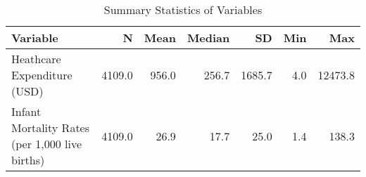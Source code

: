 \begin{table}[H]
\caption{Summary Statistics of Variables}
\label{Table 2:summary_stats}
\begin{tabular}{lrrrrrr}
\toprule
Variable & N & Mean & Median & SD & Min & Max \\
\midrule
Heathcare Expenditure (USD) & 4109.0 & 956.0 & 256.7 & 1685.7 & 4.0 & 12473.8 \\
Infant Mortality Rates (per 1,000 live births) & 4109.0 & 26.9 & 17.7 & 25.0 & 1.4 & 138.3 \\
\bottomrule
\end{tabular}
\end{table}

